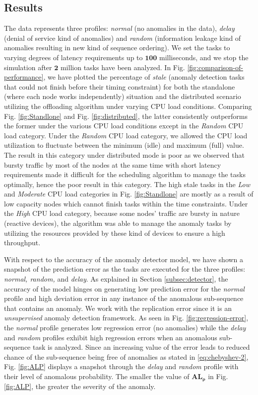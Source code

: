 \subsection{Results}
\label{subsec:results}
The data represents three profiles: \emph{normal} (no 
anomalies in the data), \emph{delay} (denial of service kind 
of anomalies) and \emph{random} (information leakage kind of 
anomalies resulting in new kind of sequence ordering). We set 
the tasks to varying degrees of latency requirements up to $ 
\bm{100} $ milliseconds, and we stop the simulation after $ 
\bm{2} $ million tasks have been analyzed. In Fig. 
\ref{fig:comparison-of-performance}, we have plotted the 
percentage of \emph{stale} (anomaly detection tasks that 
could not finish before their timing constraint) for both the 
standalone (where each node works independently) situation 
and the distributed scenario utilizing the offloading 
algorithm under varying CPU load conditions. Comparing Fig. 
\ref{fig:Standlone} and Fig. \ref{fig:distributed}, the 
latter consistently outperforms the former under the various 
CPU load conditions 
except in the \emph{Random} CPU load category. Under the 
\emph{Random} CPU load category, we allowed the CPU load 
utilization to fluctuate between the 
minimum (idle) and maximum (full) value. The result in this 
category under distributed mode is poor as we observed that 
bursty 
traffic by most of the nodes at the same time with short 
latency requirements made it difficult for the scheduling 
algorithm to 
manage the tasks optimally, hence the poor result in this 
category. The high stale tasks in the \emph{Low} and 
\emph{Moderate} CPU load categories in Fig. 
\ref{fig:Standlone} are mostly as a result of 
low capacity nodes which cannot finish tasks within the time 
constraints. Under the \emph{High} CPU load category, because 
some nodes' traffic are bursty in nature (reactive devices), 
the algorithm was able to manage the anomaly tasks by 
utilizing the resources provided by these kind of devices to 
ensure a high throughput. \par 
With respect to the accuracy of the anomaly detector model, 
we 
have shown a snapshot of the prediction error as the tasks 
are executed for the three profiles: \emph{normal, random, 
} and \emph{delay}. As explained in Section 
\ref{subsec:detector}, the 
accuracy of the model hinges on generating low prediction 
error for the \emph{normal} profile and high deviation error 
in any instance of the anomalous sub-sequence that contains 
an anomaly. We work with the replication error since it is an 
\emph{unsupervised} anomaly detection framework. As seen in 
Fig. \ref{fig:regression-error}, the \emph{normal} profile 
generates low regression error (no anomalies) while the 
\emph{delay} and \emph{random} profiles exhibit high 
regression errors when an anomalous sub-sequence task is 
analyzed. Since an increasing value of the error leads to 
reduced chance of the sub-sequence being free of anomalies as 
stated in \eqref{eq:chebyshev-2}, Fig. \ref{fig:ALP} 
displays a snapshot through the \emph{delay} and 
\emph{random} profile with their level of anomalous 
probability. The smaller the value of $ \bm{AL_{\rho}} $ in 
Fig. \ref{fig:ALP}, the greater the severity of the anomaly.

